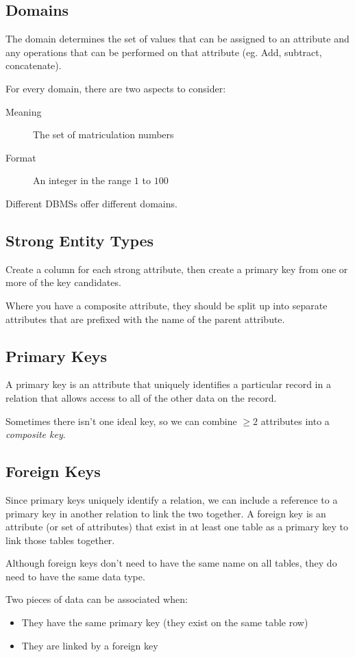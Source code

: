 \subsection{Domains}\label{sub:domains}

The domain determines the set of values that can be assigned to an attribute  and any operations that can be performed on that attribute (eg. Add, subtract, concatenate).

For every domain, there are two aspects to consider:
\begin{description}
    \item[Meaning] The set of matriculation numbers
    \item[Format] An integer in the range \(1\) to \(100\)
\end{description}

\begin{note}
    Different DBMSs offer different domains.
\end{note}

\subsection{Strong Entity Types}\label{sub:strong_entity_types}

Create a column for each strong attribute, then create a primary key from one or more of the key candidates.

Where you have a composite attribute, they should be split up into separate attributes that are prefixed with the name of the parent attribute.

\subsection{Primary Keys}\label{sub:primary_keys_four}

A primary key is an attribute that uniquely identifies a particular record in a relation that allows access to all of the other data on the record.

Sometimes there isn't one ideal key, so we can combine \(\geq 2\) attributes into a \emph{composite key}.

\subsection{Foreign Keys}\label{sub:foreign_keys}

Since primary keys uniquely identify a relation, we can include a reference to a primary key in another relation to link the two together.
A foreign key is an attribute (or set of attributes) that exist in at least one table as a primary key to link those tables together.
\begin{note}
    Although foreign keys don't need to have the same name on all tables, they do need to have the same data type.
\end{note}
Two pieces of data can be associated when:
\begin{itemize}
    \item They have the same primary key (they exist on the same table row)
    \item They are linked by a foreign key
\end{itemize}

